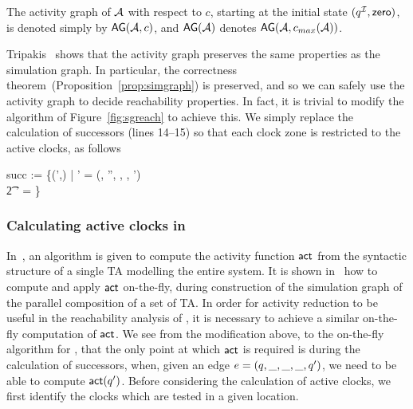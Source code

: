 \begin{notation}
The activity graph of $\AA$ with respect to $c$, starting at the initial 
state $(\tgiloc,\cczero)$, is denoted simply by $\AG(\AA,c)$, and
$\AG(\AA)$ denotes $\AG(\AA,\cmax(\AA))$.
\end{notation}

Tripakis~\cite{tri:98} shows that the activity graph preserves the
same properties as the simulation graph. In particular, the
correctness theorem~(Proposition~\ref{prop:simgraph}) is preserved,
and so we can safely use the activity graph to decide reachability
properties. In fact, it is trivial to modify the algorithm of
Figure~\ref{fig:sgreach} to achieve this. We simply replace the
calculation of successors (lines 14--15) so that each clock zone is
restricted to the active clocks, as follows
\begin{zed}
      succ := \{(\tgloc',) | \tgloc {} \tgloc' \land \tgedge = (\tgloc, \vexcond'', \any, \resets, \tgloc') \land \\
  \t2 \vexcond' =  \neq \emptyset\}
\end{zed}

\subsubsection{Calculating active clocks in \bcandle}
In~\cite{dy:96}, an algorithm is given to compute the activity function
${\mathop{\sf act}}$ from the syntactic structure of a single TA modelling the entire 
system. It is shown in~\cite{dt:98} how to compute and apply ${\mathop{\sf act}}$ on-the-fly,
during construction of the simulation graph of the parallel composition
of a set of TA. In order for activity reduction to be useful in the
reachability analysis of \bcandle, it is necessary to achieve a similar
on-the-fly computation of ${\mathop{\sf act}}$. We see from the modification above,
to the on-the-fly algorithm for \bcandle, that the only point at which
${\mathop{\sf act}}$ is required is during the calculation of successors, when,
given an edge $e = (q,\_,\_,\_,q')$,
we need to be able to compute ${\mathop{\sf act}}(q')$. Before considering the 
calculation of active clocks, we first identify the clocks which are tested
in a given location.


